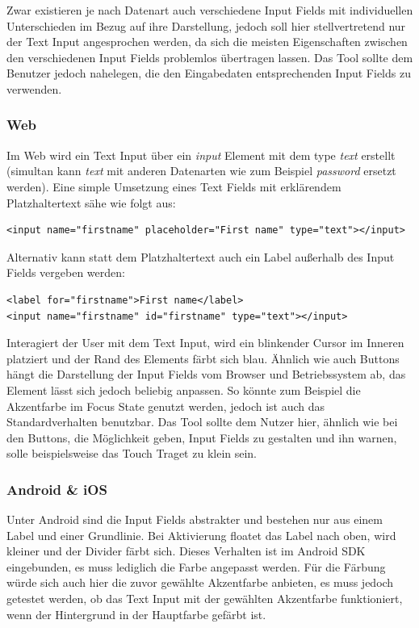 Zwar existieren je nach Datenart auch verschiedene Input Fields mit individuellen Unterschieden im Bezug auf ihre Darstellung, jedoch soll hier stellvertretend nur der Text Input angesprochen werden, da sich die meisten Eigenschaften zwischen den verschiedenen Input Fields problemlos übertragen lassen. Das Tool sollte dem Benutzer jedoch nahelegen, die den Eingabedaten entsprechenden Input Fields zu verwenden.

\subsubsection{Web}
Im Web wird ein Text Input über ein \textit{input} Element mit dem type \textit{text} erstellt (simultan kann \textit{text} mit anderen Datenarten wie zum Beispiel \textit{password} ersetzt werden). Eine simple Umsetzung eines Text Fields mit erklärendem Platzhaltertext sähe wie folgt aus:

\begin{lstlisting}
<input name="firstname" placeholder="First name" type="text"></input>
\end{lstlisting}

Alternativ kann statt dem Platzhaltertext auch ein Label außerhalb des Input Fields vergeben werden:

\begin{lstlisting}
<label for="firstname">First name</label>
<input name="firstname" id="firstname" type="text"></input>
\end{lstlisting}

Interagiert der User mit dem Text Input, wird ein blinkender Cursor im Inneren platziert und der Rand des Elements färbt sich blau.  Ähnlich wie auch Buttons hängt die Darstellung der Input Fields vom Browser und Betriebssystem ab, das Element lässt sich jedoch beliebig anpassen. So könnte zum Beispiel die Akzentfarbe im Focus State genutzt werden, jedoch ist auch das Standardverhalten benutzbar. Das Tool sollte dem Nutzer hier, ähnlich wie bei den Buttons, die Möglichkeit geben, Input Fields zu gestalten und ihn warnen, solle beispielsweise das Touch Traget zu klein sein.

\subsubsection{Android \& iOS}
Unter Android sind die Input Fields abstrakter und bestehen nur aus einem Label und einer Grundlinie. Bei Aktivierung floatet das Label nach oben, wird kleiner und der Divider färbt sich. Dieses Verhalten ist im Android SDK eingebunden, es muss lediglich die Farbe angepasst werden.
Für die Färbung würde sich auch hier die zuvor gewählte Akzentfarbe anbieten, es muss jedoch getestet werden, ob das Text Input mit der gewählten Akzentfarbe funktioniert, wenn der Hintergrund in der Hauptfarbe gefärbt ist.

